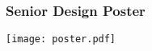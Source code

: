 \documentclass{beamer}
\begin{document}


\begin{frame}

  \frametitle{Senior Design Poster}

  \begin{center}
    \texttt{[image: poster.pdf]}
  \end{center}

\end{frame}

\end{document}
